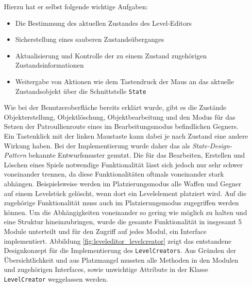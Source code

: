 Hierzu hat er selbst folgende wichtige Aufgaben:
\begin{itemize}
	\item Die Bestimmung des aktuellen Zustandes des Level-Editors
	\item Sicherstellung eines \glqq{}sauberen\grqq{} Zustandsüberganges
	\item Aktualisierung und Kontrolle der zu einem Zustand zugehörigen Zustandsinformationen
	\item Weitergabe von Aktionen wie dem Tastendruck der Maus an das aktuelle Zustandsobjekt über die Schnittstelle \texttt{State}
\end{itemize}

Wie bei der Benutzeroberfläche bereits erklärt wurde, gibt es die Zustände Objekterstellung, Objektlöschung, Objektbearbeitung und den Modus für das Setzen der Patroullienroute eines im Bearbeitungsmodus befindlichen Gegners. Ein Tastenklick mit der linken Maustaste kann dabei je nach Zustand eine andere Wirkung haben. Bei der Implementierung wurde daher das als \textit{State-Design-Pattern}\cite{Gamma.2011} bekannte Entwurfsmuster genutzt. Die für das Bearbeiten, Erstellen und Löschen eines Spiels notwendige Funktionalität lässt sich jedoch nur sehr schwer voneinander trennen, da diese Funktionalitäten oftmals voneinander stark abhängen. Beispielsweise werden im Platzierungsmodus alle Waffen und Gegner auf einem Levelstück gelöscht, wenn dort ein Levelelement platziert wird. Auf die zugehörige Funktionalität muss auch im Platzierungsmodus zugegriffen werden können. Um die Abhängigkeiten voneinander so gering wie möglich zu halten und eine Struktur hineinzubringen, wurde die gesamte Funktionalität in insgesamt 5 Module unterteilt und für den Zugriff auf jedes Modul, ein Interface implementiert. Abbildung \ref{fig:leveleditor_levelcreator} zeigt das entstandene Designkonzept für die Implementierung des \texttt{LevelCreators}. Aus Gründen der Übersichtlichkeit und aus Platzmangel mussten alle Methoden in den Modulen und zugehörigen Interfaces, sowie unwichtige Attribute in der Klasse \texttt{LevelCreator} weggelassen werden. 

